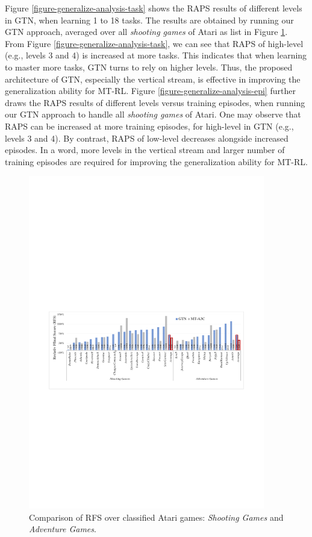 \documentclass[letterpaper]{article} %
\begin{document}
Figure \ref{figure-generalize-analysis-task} shows the RAPS results of different levels in GTN, when learning 1 to 18 tasks.
The results are obtained by running our GTN approach, averaged over all \textit{shooting games} of Atari as list in Figure \ref{figure-resn-1}.
From Figure \ref{figure-generalize-analysis-task}, we can see that RAPS of high-level (e.g., levels 3 and 4) is increased at more tasks.
This indicates that when learning to master more tasks, GTN turns to rely on higher levels.
Thus, the proposed architecture of GTN, especially the vertical stream, is effective in improving the generalization ability for MT-RL.
Figure \ref{figure-generalize-analysis-epi} further draws the RAPS results of different levels versus training episodes, when running our GTN approach to handle all \textit{shooting games} of Atari.
One may observe that RAPS can be increased at more training episodes, for high-level in GTN (e.g., levels 3 and 4).
By contrast, RAPS of low-level decreases alongside increased episodes.
In a word, more levels in the vertical stream and larger number of training episodes are required for improving the generalization ability for MT-RL.
\begin{figure}[htb]
	\begin{center}
		\centerline{\includegraphics[width=0.92\textwidth]{figure/figure-resn-1}}
		\caption{
                Comparison of RFS over classified Atari games: \textit{Shooting Games} and \textit{Adventure Games}.
            }
		\label{figure-resn-1}
	\end{center}
\end{figure}
\end{document}
